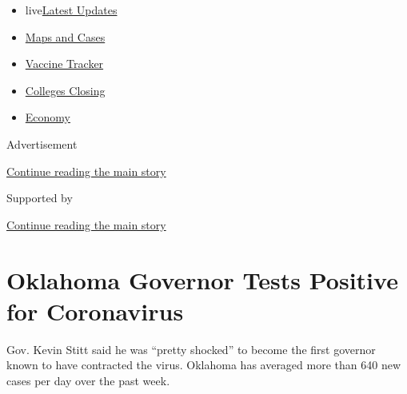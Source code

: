\begin{itemize}
\tightlist
\item
  live\href{https://www.nytimes3xbfgragh.onion/2020/08/21/world/covid-19-coronavirus.html?name=styln-coronavirus-national\&region=TOP_BANNER\&variant=undefined\&block=storyline_menu_recirc\&action=click\&pgtype=Article\&impression_id=6b5ff591-e393-11ea-a514-19f42751590e}{Latest
  Updates}
\item
  \href{https://www.nytimes3xbfgragh.onion/interactive/2020/us/coronavirus-us-cases.html?name=styln-coronavirus-national\&region=TOP_BANNER\&variant=undefined\&block=storyline_menu_recirc\&action=click\&pgtype=Article\&impression_id=6b5ff592-e393-11ea-a514-19f42751590e}{Maps
  and Cases}
\item
  \href{https://www.nytimes3xbfgragh.onion/interactive/2020/science/coronavirus-vaccine-tracker.html?name=styln-coronavirus-national\&region=TOP_BANNER\&variant=undefined\&block=storyline_menu_recirc\&action=click\&pgtype=Article\&impression_id=6b601ca0-e393-11ea-a514-19f42751590e}{Vaccine
  Tracker}
\item
  \href{https://www.nytimes3xbfgragh.onion/2020/08/19/us/colleges-closing-covid.html?name=styln-coronavirus-national\&region=TOP_BANNER\&variant=undefined\&block=storyline_menu_recirc\&action=click\&pgtype=Article\&impression_id=6b601ca1-e393-11ea-a514-19f42751590e}{Colleges
  Closing}
\item
  \href{https://www.nytimes3xbfgragh.onion/live/2020/08/20/business/stock-market-today-coronavirus?name=styln-coronavirus-national\&region=TOP_BANNER\&variant=undefined\&block=storyline_menu_recirc\&action=click\&pgtype=Article\&impression_id=6b601ca2-e393-11ea-a514-19f42751590e}{Economy}
\end{itemize}

Advertisement

\protect\hyperlink{after-top}{Continue reading the main story}

Supported by

\protect\hyperlink{after-sponsor}{Continue reading the main story}

\hypertarget{oklahoma-governor-tests-positive-for-coronavirus}{%
\section{Oklahoma Governor Tests Positive for
Coronavirus}\label{oklahoma-governor-tests-positive-for-coronavirus}}

Gov. Kevin Stitt said he was ``pretty shocked'' to become the first
governor known to have contracted the virus. Oklahoma has averaged more
than 640 new cases per day over the past week.

